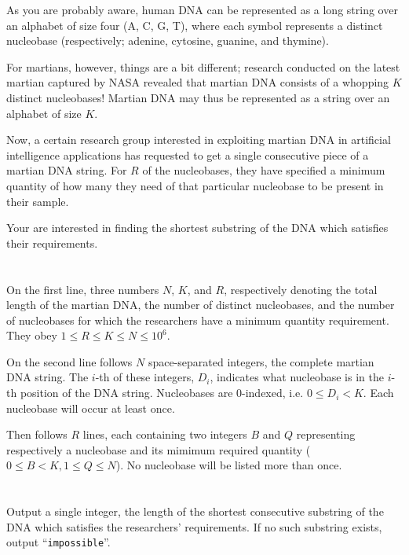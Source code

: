 \ifx\boi\undefined\fi
\def\version{jury-1}
As you are probably aware, human DNA can be represented as a long string over
an alphabet of size four ({A, C, G, T}), where each symbol represents a
distinct nucleobase (respectively; adenine, cytosine, guanine, and thymine).

For martians, however, things are a bit different; research conducted on the
latest martian captured by NASA revealed that martian DNA consists of a
whopping $K$ distinct nucleobases! Martian DNA may thus be represented as a
string over an alphabet of size $K$.

Now, a certain research group interested in exploiting martian DNA in
artificial intelligence applications has requested to get a single consecutive
piece of a martian DNA string. For $R$ of the nucleobases, they have specified
a minimum quantity of how many they need of that particular nucleobase to be
present in their sample.

Your are interested in finding the shortest substring of the DNA which satisfies their requirements.

\section*{}
On the first line, three numbers $N$, $K$, and $R$, respectively denoting the
total length of the martian DNA, the number of distinct nucleobases, and the
number of nucleobases for which the researchers have a minimum quantity
requirement. They obey $1 \le R \le K \le N \le 10^6$.

On the second line follows $N$ space-separated integers, the complete martian
DNA string. The $i$-th of these integers, $D_i$, indicates what nucleobase is
in the $i$-th position of the DNA string. Nucleobases are $0$-indexed, i.e. $0
\leq D_i < K$. Each nucleobase will occur at least once.

Then follows $R$ lines, each containing two integers $B$ and $Q$ representing
respectively a nucleobase and its mimimum required quantity ($0 \le B < K, 1 \le Q \le N$).
No nucleobase will be listed more than once.

\section*{\outputsection}
Output a single integer, the length of the shortest consecutive substring of
the DNA which satisfies the researchers' requirements. If no such substring
exists, output ``\texttt{impossible}''.


